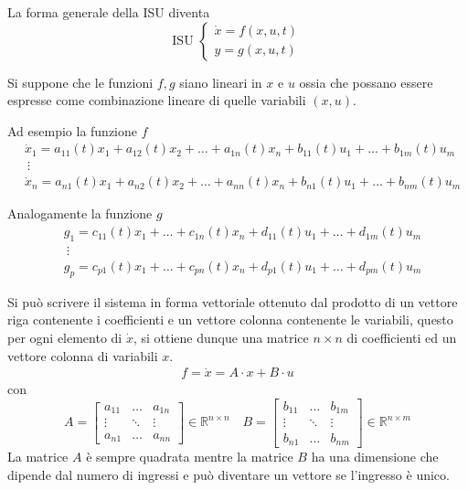 La forma generale della ISU diventa
\begin{equation}\text{ISU }\left\{
\begin{aligned}
\dot{x} = f(x,u,t)\\
y = g(x,u,t)
\end{aligned}\right.
\label{eq.:ISU_compatta}
\end{equation}

Si suppone che le funzioni $f,g$ siano lineari in $x$ e $u$ ossia che possano essere espresse come
combinazione lineare di quelle variabili $(x,u)$.

Ad esempio la funzione $f$
$$\begin{aligned}
&\dot{x}_1 = a_{11}(t)x_1+a_{12}(t)x_2 + \ldots + a_{1n}(t)x_n + b_{11}(t)u_1+\ldots+b_{1m}(t)u_m\\
&\ \vdots\\
&\dot{x}_n = a_{n1}(t)x_1 +  a_{n2}(t)x_2 + \ldots + a_{nn}(t)x_n + b_{n1}(t)u_1+\ldots+b_{nm}(t)u_m
\end{aligned}
$$

Analogamente la funzione $g$
$$\begin{aligned}
&g_1 = c_{11}(t)x_1 + \ldots + c_{1n}(t)x_n + d_{11}(t)u_1 + \ldots + d_{1m}(t)u_m\\
&\ \vdots\\
&g_p = c_{p1}(t)x_1 + \ldots + c_{pn}(t)x_n + d_{p1}(t)u_1+\ldots+d_{pm}(t)u_m
\end{aligned}$$

Si può scrivere il sistema in forma vettoriale ottenuto dal prodotto di un vettore riga contenente
i coefficienti e un vettore colonna contenente le variabili, questo per ogni elemento di
$\dot{x}$, si ottiene dunque una matrice $n\times n$ di coefficienti ed un vettore colonna di
variabili $x$.
$$\begin{aligned}
f = \dot{x} = A \cdot x + B\cdot u
\end{aligned}
$$
con
$$
A = \begin{bmatrix}
a_{11} & \dots & a_{1n} \\
\vdots & \ddots & \vdots \\
a_{n1} & \dots & a_{nn}
\end{bmatrix} \in \mathbb{R}^{n\times n} \quad
B = \begin{bmatrix}
b_{11} & \dots & b_{1m} \\
\vdots & \ddots & \vdots \\
b_{n1} & \dots & b_{nm}
\end{bmatrix} \in \mathbb{R}^{n\times m}
$$
La matrice $A$ è sempre quadrata mentre la matrice $B$ ha una dimensione che dipende dal numero di
ingressi e può diventare un vettore se l'ingresso è unico.

